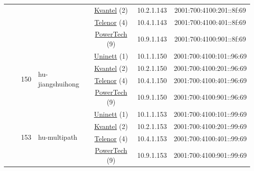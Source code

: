 \begin{small}
\begin{center}
\begin{longtable}{|c|c|c|c|c|c|c|c|}
  &  &  &  & \multicolumn{2}{|c|}{\tiny{\href{http://kvantel.no}{Kvantel} (2)}} & \tiny{10.2.1.143} & \tiny{2001:700:4100:201::8f:69} \\* \cline{5-5}\cline{6-6}\cline{7-7}\cline{8-8}
  &  &  &  & \multicolumn{2}{|c|}{\tiny{\href{https://www.telenor.no}{Telenor} (4)}} & \tiny{10.4.1.143} & \tiny{2001:700:4100:401::8f:69} \\* \cline{5-5}\cline{6-6}\cline{7-7}\cline{8-8}
  &  &  &  & \multicolumn{2}{|c|}{\tiny{\href{http://www.powertech.no}{PowerTech} (9)}} & \tiny{10.9.1.143} & \tiny{2001:700:4100:901::8f:69} \\* \cline{3-3}\cline{4-4}\cline{5-5}\cline{6-6}\cline{7-7}\cline{8-8}
  &  & \multirow{4}{*}{\tiny{150}} & \multicolumn{1}{|l|}{\multirow{4}{*}{\tiny{hu-jiangshuihong}}} & \multicolumn{2}{|c|}{\tiny{\href{https://www.uninett.no}{Uninett} (1)}} & \tiny{10.1.1.150} & \tiny{2001:700:4100:101::96:69} \\* \cline{5-5}\cline{6-6}\cline{7-7}\cline{8-8}
  &  &  &  & \multicolumn{2}{|c|}{\tiny{\href{http://kvantel.no}{Kvantel} (2)}} & \tiny{10.2.1.150} & \tiny{2001:700:4100:201::96:69} \\* \cline{5-5}\cline{6-6}\cline{7-7}\cline{8-8}
  &  &  &  & \multicolumn{2}{|c|}{\tiny{\href{https://www.telenor.no}{Telenor} (4)}} & \tiny{10.4.1.150} & \tiny{2001:700:4100:401::96:69} \\* \cline{5-5}\cline{6-6}\cline{7-7}\cline{8-8}
  &  &  &  & \multicolumn{2}{|c|}{\tiny{\href{http://www.powertech.no}{PowerTech} (9)}} & \tiny{10.9.1.150} & \tiny{2001:700:4100:901::96:69} \\* \cline{3-3}\cline{4-4}\cline{5-5}\cline{6-6}\cline{7-7}\cline{8-8}
  &  & \multirow{4}{*}{\tiny{153}} & \multicolumn{1}{|l|}{\multirow{4}{*}{\tiny{hu-multipath}}} & \multicolumn{2}{|c|}{\tiny{\href{https://www.uninett.no}{Uninett} (1)}} & \tiny{10.1.1.153} & \tiny{2001:700:4100:101::99:69} \\* \cline{5-5}\cline{6-6}\cline{7-7}\cline{8-8}
  &  &  &  & \multicolumn{2}{|c|}{\tiny{\href{http://kvantel.no}{Kvantel} (2)}} & \tiny{10.2.1.153} & \tiny{2001:700:4100:201::99:69} \\* \cline{5-5}\cline{6-6}\cline{7-7}\cline{8-8}
  &  &  &  & \multicolumn{2}{|c|}{\tiny{\href{https://www.telenor.no}{Telenor} (4)}} & \tiny{10.4.1.153} & \tiny{2001:700:4100:401::99:69} \\* \cline{5-5}\cline{6-6}\cline{7-7}\cline{8-8}
  &  &  &  & \multicolumn{2}{|c|}{\tiny{\href{http://www.powertech.no}{PowerTech} (9)}} & \tiny{10.9.1.153} & \tiny{2001:700:4100:901::99:69} \\* \cline{3-3}\cline{4-4}\cline{5-5}\cline{6-6}\cline{7-7}\cline{8-8}

\end{longtable}
\end{center}
\end{small}

